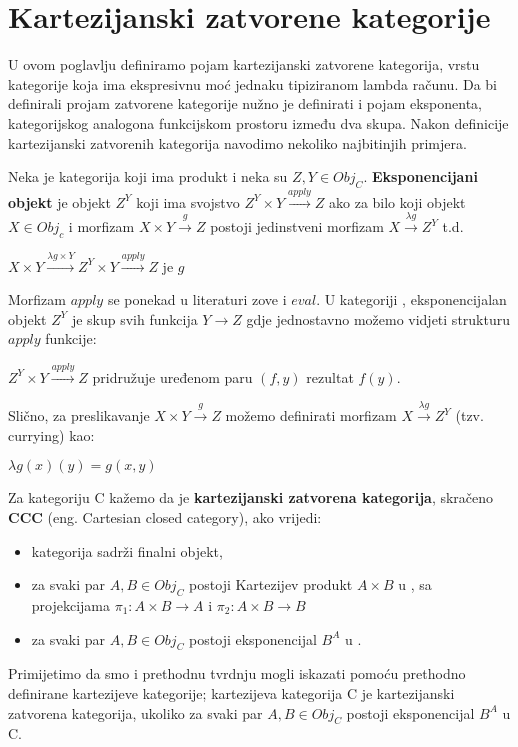   \section{Kartezijanski zatvorene kategorije}
  U ovom poglavlju definiramo pojam kartezijanski zatvorene kategorija, vrstu kategorije koja ima ekspresivnu moć jednaku tipiziranom lambda računu.  Da bi definirali projam zatvorene kategorije nužno je definirati i pojam eksponenta, kategorijskog analogona funkcijskom prostoru između dva skupa. Nakon definicije kartezijanski zatvorenih kategorija navodimo nekoliko najbitinjih primjera. 
  \begin{definition}
    Neka je  kategorija koji ima produkt i neka su $Z, Y \in Obj_C$. \textbf{Eksponencijani objekt} je objekt $Z^Y$ koji ima svojstvo $Z^Y \times Y \xrightarrow{apply} Z$ ako za bilo koji objekt $X \in Obj_c$ i morfizam $X \times Y \xrightarrow{g} Z$ postoji jedinstveni morfizam $X \xrightarrow{\lambda g} Z^Y$ t.d.
    \begin{center}
      $X \times Y \xrightarrow{\lambda g \times Y} Z^Y \times Y \xrightarrow{apply} Z$ je $g$
    \end{center}
  \end{definition}
    Morfizam $apply$ se ponekad u literaturi zove i $eval$. U kategoriji , eksponencijalan objekt $Z^Y$ je skup svih funkcija $Y \to Z$ gdje jednostavno možemo vidjeti strukturu $apply$ funkcije:
    \begin{center}
      $Z^Y \times Y \xrightarrow{apply} Z$ pridružuje uređenom paru $(f, y)$ rezultat $f(y)$.
    \end{center}
    Slično, za preslikavanje $X \times Y \xrightarrow{g} Z$ možemo definirati morfizam $X \xrightarrow{\lambda g} Z^Y$ (tzv. currying) kao:
    \begin{center}
      $\lambda g(x)(y) = g(x, y)$
    \end{center}
  \begin{definition}
    Za kategoriju C kažemo da je \textbf{kartezijanski zatvorena kategorija}, skračeno \textbf{CCC} (eng. Cartesian closed category), ako vrijedi:
    \begin{itemize}
      \item kategorija  sadrži finalni objekt,
      \item za svaki par $A, B \in Obj_C$ postoji Kartezijev produkt $A \times B$ u , sa projekcijama $\pi_1 : A \times B \to A$ i $\pi_2 : A \times B \to B$
      \item za svaki par $A, B \in Obj_C$ postoji eksponencijal $B^A$ u .
    \end{itemize}
  \end{definition}
  Primijetimo da smo i prethodnu tvrdnju mogli iskazati pomoću prethodno definirane kartezijeve kategorije; kartezijeva kategorija C je kartezijanski zatvorena kategorija, ukoliko za svaki par $A, B \in Obj_C$ postoji eksponencijal $B^A$ u C.

